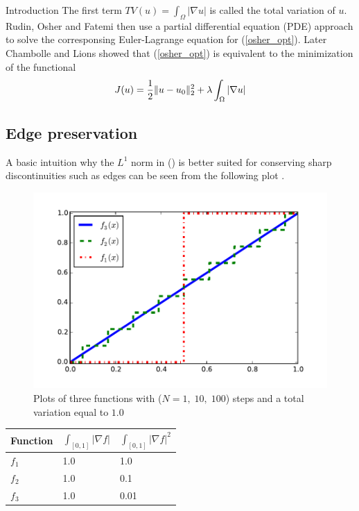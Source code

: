 \begin{chapter}{Introduction}
The first term $TV(u)=\int_\Omega\left\vert\nabla u\right\vert$ is called the total variation of $u$. Rudin, Osher and Fatemi then use a partial differential equation (PDE) approach to solve
the corresponsing Euler-Lagrange equation for (\ref{osher_opt}). Later Chambolle and Lions \cite{ChambolleLions} showed that (\ref{osher_opt}) is equivalent to the minimization of
the functional
\begin{equation}
    \label{osher_func}
    J(u)=\frac{1}{2}\| u-u_0 \|_2^2 +\lambda \int_\Omega\left\vert\nabla u\right\vert
\end{equation}

\subsection{Edge preservation} %
\label{sub:Edge preservation}
A basic intuition why the $L^1$ norm in (\cite{RudinOsher}) is better suited for conserving sharp discontinuities such as edges can be seen from the following plot \cite{SceneFlow}.\\

\begin{figure}[h!]
        \centering
	    \includegraphics[width=0.9\linewidth]{./figures/introduction/tv12comparison.pdf}
	\caption[Comparison total variation]{Plots of three functions with ($N=1,\;10,\;100$) steps and a total variation equal to $1.0$}
	\label{fig:tv12comparison}
\end{figure}
\begin{table}[h!]
\centering
\begin{tabular}{|l|l|l|}
    \hline
    \textbf{Function} & $\int_{[0,1]}\left\vert\nabla f\right\vert$ & $\int_{[0,1]}\left\vert\nabla f\right\vert^2$ \\
    \hline
    $f_1$ & 1.0 & 1.0 \\
    $f_2$ & 1.0 & 0.1 \\
    $f_3$ & 1.0 & 0.01 \\
    \hline
\end{tabular}
\end{table}


\end{chapter}
